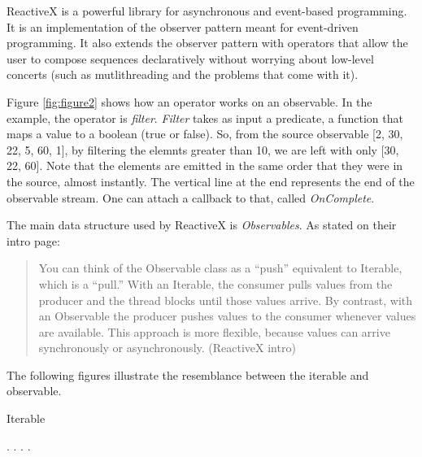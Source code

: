 \documentclass[chi_draft]{sigchi}
\begin{document}
ReactiveX is a powerful library for asynchronous and event-based programming. It is an implementation of the observer pattern meant for event-driven programming. It also extends the observer pattern with operators that allow the user to compose sequences declaratively without worrying about low-level concerts (such as mutlithreading and the problems that come with it).


Figure \ref{fig:figure2} shows how an operator works on an observable. In the example, the operator is \textit{filter}. \textit{Filter} takes as input a predicate, a function that maps a value to a boolean (true or false). So, from the source observable [2, 30, 22, 5, 60, 1], by filtering the elemnts greater than 10, we are left with only [30, 22, 60]. Note that the elements are emitted in the same order that they were in the source, almost instantly. The vertical line at the end represents the end of the observable stream. One can attach a callback to that, called \textit{OnComplete}.


The main data structure used by ReactiveX is \textit{Observables}. As stated on their intro page:

\begin{quote}
  You can think of the Observable class as a “push” equivalent to Iterable, which is a “pull.” With an Iterable, the consumer pulls values from the producer and the thread blocks until those values arrive. By contrast, with an Observable the producer pushes values to the consumer whenever values are available. This approach is more flexible, because values can arrive synchronously or asynchronously. (ReactiveX intro)
\end{quote}


The following figures illustrate the resemblance between the iterable and observable.

\begin{algorithm}
  \label{algorithm.iterable}
  \caption{Iterable}
  \begin{algorithmic}
    \State {}
      \State .
      \State .
      \State .
      \State .
  \end{algorithmic}
\end{algorithm}

\end{document}
